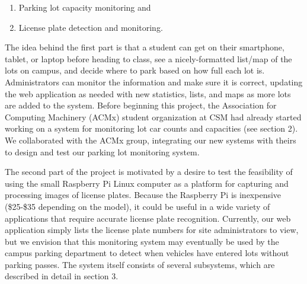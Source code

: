 \documentclass[11pt, oneside, fullpage, doublespace]{article}
\begin{document}
\begin{enumerate}
\item Parking lot capacity monitoring and
\item License plate detection and monitoring.
\end{enumerate}

The idea behind the first part is that a student can get on their smartphone, tablet, or laptop before heading to class, see a nicely-formatted list/map of the lots on campus, and decide where to park based on how full each lot is. Administrators can monitor the information and make sure it is correct, updating the web application as needed with new statistics, lists, and maps as more lots are added to the system. Before beginning this project, the Association for Computing Machinery (ACMx) student organization at CSM had already started working on a system for monitoring lot car counts and capacities (see section 2). We collaborated with the ACMx group, integrating our new systems with theirs to design and test our parking lot monitoring system.

The second part of the project is motivated by a desire to test the feasibility of using the small Raspberry Pi Linux computer as a platform for capturing and processing images of license plates. Because the Raspberry Pi is inexpensive (\$25-\$35 depending on the model), it could be useful in a wide variety of applications that require accurate license plate recognition. Currently, our web application simply lists the license plate numbers for site administrators to view, but we envision that this monitoring system may eventually be used by the campus parking department to detect when vehicles have entered lots without parking passes. The system itself consists of several subsystems, which are described in detail in section 3.
\end{document}
